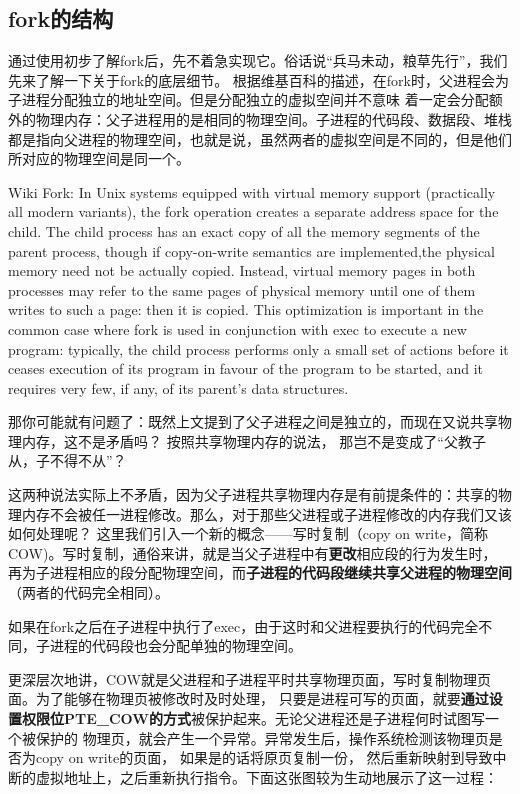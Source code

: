 \subsection{fork的结构}

通过使用初步了解fork后，先不着急实现它。俗话说“兵马未动，粮草先行”，我们先来了解一下关于fork的底层细节。
根据维基百科的描述，在fork时，父进程会为子进程分配独立的地址空间。但是分配独立的虚拟空间并不意味
着一定会分配额外的物理内存：父子进程用的是相同的物理空间。子进程的代码段、数据段、堆栈
都是指向父进程的物理空间，也就是说，虽然两者的虚拟空间是不同的，但是他们所对应的物理空间是同一个。

\begin{note}
\small{
Wiki Fork: In Unix systems equipped with virtual memory support (practically all modern variants), the fork operation creates a separate address space
 for the child. The child process has an exact copy of all the memory segments of the parent process, though if copy-on-write semantics 
 are implemented,the physical memory need not be actually copied. Instead, virtual memory pages in both processes may refer to the same pages of physical memory 
 until one of them writes to such a page: then it is copied. This optimization is important in the common case where fork is used 
 in conjunction with exec to execute a new program: typically, the child process performs only a small set of actions before it ceases
 execution of its program in favour of the program to be started, and it requires very few, if any, of its parent's data structures.}
\end{note}

那你可能就有问题了：既然上文提到了父子进程之间是独立的，而现在又说共享物理内存，这不是矛盾吗？
按照共享物理内存的说法， 那岂不是变成了“父教子从，子不得不从”？

这两种说法实际上不矛盾，因为父子进程共享物理内存是有前提条件的：共享的物理内存不会被任一进程修改。那么，对于那些父进程或子进程修改的内存我们又该如何处理呢？
这里我们引入一个新的概念——写时复制（copy on write，简称COW)。写时复制，通俗来讲，就是当父子进程中有\textbf{更改}相应段的行为发生时，
再为子进程相应的段分配物理空间，而\textbf{子进程的代码段继续共享父进程的物理空间}（两者的代码完全相同）。

\begin{note}
如果在fork之后在子进程中执行了exec，由于这时和父进程要执行的代码完全不同，子进程的代码段也会分配单独的物理空间。
\end{note}

更深层次地讲，COW就是父进程和子进程平时共享物理页面，写时复制物理页面。为了能够在物理页被修改时及时处理，
只要是进程可写的页面，就要\textbf{通过设置权限位PTE\_COW的方式}被保护起来。\label{页保护与处理}无论父进程还是子进程何时试图写一个被保护的
物理页，就会产生一个异常。异常发生后，操作系统检测该物理页是否为copy on write的页面， 如果是的话将原页复制一份，
然后重新映射到导致中断的虚拟地址上，之后重新执行指令。下面这张图较为生动地展示了这一过程：


